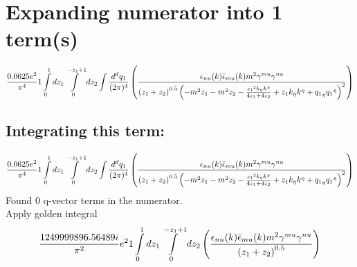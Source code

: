 \section*{Expanding numerator into 1 term(s)}
\begin{dmath}\frac{0.0625 e^{2}}{\pi^{4}}1\int\limits_{ 0 }^{ 1 } d{ z_{ 1 } }\int\limits_{ 0 }^{ - { z_{ 1 } } + 1 } d{ z_{ 2 } }\int\frac{d^d q_1 }{ (2\pi)^4 }\left(\frac{\epsilon_{ \\nu }({ k }) \bar{\epsilon}_{ \\mu }({ k }) m^{2} { \gamma^{ \\mu } } { \gamma^{ \\nu } }}{\left({ z_{ 1 } } + { z_{ 2 } }\right)^{0.5} \left(- m^{2} { z_{ 1 } } - m^{2} { z_{ 2 } } - \frac{{ z_{ 1 } }^{2} { { k }_{ \eta } } { { k }^{ \eta } }}{4 { z_{ 1 } } + 4 { z_{ 2 } }} + { z_{ 1 } } { { k }_{ \eta } } { { k }^{ \eta } } + { { q_1 }_{ \eta } } { { q_1 }^{ \eta } }\right)^{2}}\right)\end{dmath}
\subsection*{Integrating this term:}
\begin{dmath}\frac{0.0625 e^{2}}{\pi^{4}}1\int\limits_{ 0 }^{ 1 } d{ z_{ 1 } }\int\limits_{ 0 }^{ - { z_{ 1 } } + 1 } d{ z_{ 2 } }\int\frac{d^d q_1 }{ (2\pi)^4 }\left(\frac{\epsilon_{ \\nu }({ k }) \bar{\epsilon}_{ \\mu }({ k }) m^{2} { \gamma^{ \\mu } } { \gamma^{ \\nu } }}{\left({ z_{ 1 } } + { z_{ 2 } }\right)^{0.5} \left(- m^{2} { z_{ 1 } } - m^{2} { z_{ 2 } } - \frac{{ z_{ 1 } }^{2} { { k }_{ \eta } } { { k }^{ \eta } }}{4 { z_{ 1 } } + 4 { z_{ 2 } }} + { z_{ 1 } } { { k }_{ \eta } } { { k }^{ \eta } } + { { q_1 }_{ \eta } } { { q_1 }^{ \eta } }\right)^{2}}\right)\end{dmath}
Found 0 q-vector terms in the numerator.\\
Apply golden integral
\begin{dmath}\frac{1249999896.56489 i}{\pi^{2}} e^{2}1\int\limits_{ 0 }^{ 1 } d{ z_{ 1 } }\int\limits_{ 0 }^{ - { z_{ 1 } } + 1 } d{ z_{ 2 } }\left(\frac{\epsilon_{ \\nu }({ k }) \bar{\epsilon}_{ \\mu }({ k }) m^{2} { \gamma^{ \\mu } } { \gamma^{ \\nu } }}{\left({ z_{ 1 } } + { z_{ 2 } }\right)^{0.5}}\right)\end{dmath}
